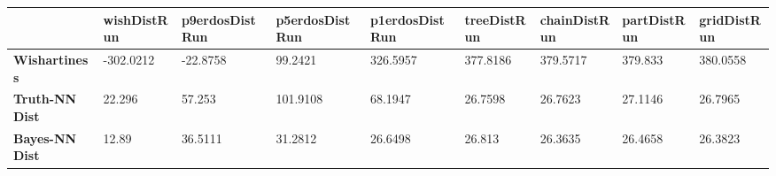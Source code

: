 \begin{tabular}{|l|l|l|l|l|l|l|l|l|}
\hline
&\textbf{wishDistRun}&\textbf{p9erdosDistRun}&\textbf{p5erdosDistRun}&\textbf{p1erdosDistRun}&\textbf{treeDistRun}&\textbf{chainDistRun}&\textbf{partDistRun}&\textbf{gridDistRun}\\\hline
\textbf{Wishartiness}&-302.0212&-22.8758&99.2421&326.5957&377.8186&379.5717&379.833&380.0558\\\hline
\textbf{Truth-NN Dist}&22.296&57.253&101.9108&68.1947&26.7598&26.7623&27.1146&26.7965\\\hline
\textbf{Bayes-NN Dist}&12.89&36.5111&31.2812&26.6498&26.813&26.3635&26.4658&26.3823\\\hline
\end{tabular}
